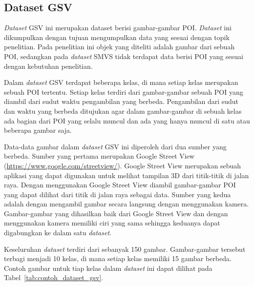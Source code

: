 \subsection{Dataset GSV}
\label{subsec:dataset_gsv}
\textit{Dataset} GSV ini merupakan dataset berisi gambar-gambar POI. \textit{Dataset} ini dikumpulkan dengan tujuan mengumpulkan data yang sesuai dengan topik penelitian. Pada penelitian ini objek yang diteliti adalah gambar dari sebuah POI, sedangkan pada \textit{dataset} SMVS tidak terdapat data berisi POI yang sesuai dengan kebutuhan penelitian. 

Dalam \textit{dataset} GSV terdapat beberapa kelas, di mana setiap kelas merupakan sebuah POI tertentu. Setiap kelas terdiri dari gambar-gambar sebuah POI yang diambil dari sudut waktu pengambilan yang berbeda. Pengambilan dari sudut dan waktu yang berbeda ditujukan agar dalam gambar-gambar di sebuah kelas ada bagian dari POI yang selalu muncul dan ada yang hanya muncul di satu atau beberapa gambar saja. 

Data-data gambar dalam \textit{dataset} GSV ini diperoleh dari dua sumber yang berbeda. Sumber yang pertama merupakan Google Street View (\url{https://www.google.com/streetview/}). Google Street View merupakan sebuah aplikasi yang dapat digunakan untuk melihat tampilan 3D dari titik-titik di jalan raya. Dengan menggunakan Google Street View diambil gambar-gambar POI yang dapat dilihat dari titik di jalan raya sebagai data. Sumber yang kedua adalah dengan mengambil gambar secara langsung dengan menggunakan kamera. Gambar-gambar yang dihasilkan baik dari Google Street View dan dengan menggunakan kamera memiliki ciri yang sama sehingga keduanya dapat digabungkan ke dalam satu \textit{dataset}.

Keseluruhan \textit{dataset} terdiri dari sebanyak 150 gambar. Gambar-gambar tersebut terbagi menjadi 10 kelas, di mana setiap kelas memiliki 15 gambar berbeda. Contoh gambar untuk tiap kelas dalam \textit{dataset} ini dapat dilihat pada Tabel~\ref{tab:contoh_dataset_gsv}.
\newpage

